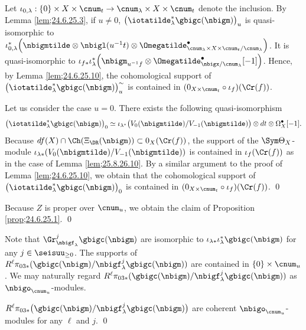 \documentclass[a4,10pt]{article}
\begin{document}
Let $\iota_{0,\lambda}:\{0\}\times X\times\cnum_t\to
\cnum_{\lambda}\times X\times\cnum_t$ denote the inclusion.
By Lemma \ref{lem;24.6.25.3},
if $u\neq 0$,
$\bigl(
\iotatilde_{\lambda}^{\ast}\gbigc(\nbigm)
\bigr)_u$
is quasi-isomorphic to
$\iota_{0,\lambda}^{\ast}\Bigl(
\nbigmtilde\otimes\nbigl(u^{-1}t)\otimes
\Omegatilde^{\bullet}
_{\cnum_{\lambda}\times X\times\cnum_t/\cnum_{\lambda}}
\Bigr)$.
It is quasi-isomorphic to
$\iota_{f\ast}\iota_{\lambda}^{\ast}
\Bigl(
 \nbigm_{u^{-1}f}\otimes
 \Omegatilde^{\bullet}_{\nbigx/\cnum_{\lambda}}[-1]
\Bigr)$.
Hence, by Lemma \ref{lem;24.6.25.10},
the cohomological support
of $\bigl(
\iotatilde_{\lambda}^{\ast}\gbigc(\nbigm)
\bigr)^{\sim}_u$
is contained in
$(0_{X\times\cnum_t}\circ\iota_f)(\Cr(f))$.

Let us consider the case $u=0$.
There exists the following quasi-isomorphism
\[
\bigl(
\iotatilde_{\lambda}^{\ast}\gbigc(\nbigm)
\bigr)_0
\simeq
\iota_{\lambda^{\ast}}
\bigl(
V_0(\nbigmtilde)/V_{-1}(\nbigmtilde)
\bigr)\otimes dt
\otimes\Omega^{\bullet}_{X}[-1].
\]
Because $df(X)\cap \Ch(\Xi_{\DR}(\nbigm))\subset
0_X(\Cr(f))$,
the support of
the $\Sym\Theta_X$-module
$\iota_{\lambda\ast}(V_0(\nbigmtilde)/V_{-1}(\nbigmtilde))$
is contained in $\iota_f(\Cr(f))$
as in the case of Lemma \ref{lem;25.8.26.10}.
By a similar argument to the proof of Lemma \ref{lem;24.6.25.10},
we obtain that
the cohomological support of
$\bigl(
\iotatilde_{\lambda}^{\ast}\gbigc(\nbigm)
\bigr)_0$
is contained in
$(0_{X\times\cnum_t}\circ\iota_f)(\Cr(f))$.
\hfill\qed

\vspace{.1in}
Because $Z$ is proper over $\cnum_u$,
we obtain the claim of Proposition  \ref{prop;24.6.25.1}.
\hfill\qed



\vspace{.1in}
Note that
$\Gr^j_{\nbigf_{\lambda}}\gbigc(\nbigm)$
are isomorphic to
$\iota_{\lambda\ast}\iota_{\lambda}^{\ast}\gbigc(\nbigm)$
for any $j\in\seisuu_{\geq 0}$.
The supports of
$R^{\ell}\pi_{03\ast}(\gbigc(\nbigm)/\nbigf^j_{\lambda}\gbigc(\nbigm))$
are contained in $\{0\}\times\cnum_u$.
We may naturally regard
$R^{\ell}\pi_{03\ast}(\gbigc(\nbigm)/\nbigf^j_{\lambda}\gbigc(\nbigm))$
as $\nbigo_{\cnum_u}$-modules.

\begin{cor}
$R^{\ell}\pi_{03\ast}\bigl(
\gbigc(\nbigm)/\nbigf_{\lambda}^j\gbigc(\nbigm)
\bigr)$
are coherent $\nbigo_{\cnum_u}$-modules
for any $\ell$ and $j$. 
\hfill\qed
\end{cor}
\end{document}
